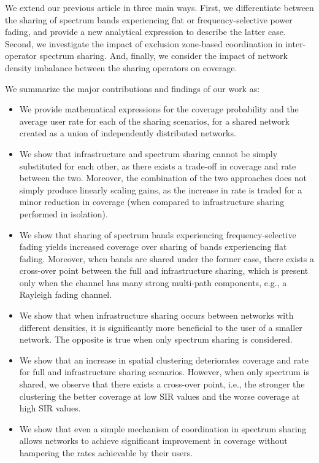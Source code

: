 \documentclass[12pt, journal,doublecolumn, final]{IEEEtran}
\begin{document}
We extend our previous article \cite{KibildaDiFrancescoMalandrinoDaSilva_2015} in three main ways. First, we differentiate between the sharing of spectrum bands experiencing flat or frequency-selective power fading, and provide a new analytical expression to describe the latter case. Second, we investigate the impact of exclusion zone-based coordination in inter-operator spectrum sharing. And, finally, we consider the impact of network density imbalance between the sharing operators on coverage.

We summarize the major contributions and findings of our work as:
\begin{itemize}
\item We provide mathematical expressions for the coverage probability and the average user rate for each of the sharing scenarios, for a shared network created as a union of  independently distributed networks.
\item We show that infrastructure and spectrum sharing cannot be simply substituted for each other, as there exists a trade-off in coverage and rate between the two. Moreover, the combination of the two approaches does not simply produce linearly scaling gains, as the increase in rate is traded for a minor reduction in coverage (when compared to infrastructure sharing performed in isolation).
\item We show that sharing of spectrum bands experiencing frequency-selective fading yields increased coverage over sharing of bands experiencing flat fading. Moreover, when bands are shared under the former case, there exists a cross-over point between the full and infrastructure sharing, which is present only when the channel has many strong multi-path components, e.g., a Rayleigh fading channel.
\item We show that when infrastructure sharing occurs between networks with different densities, it is significantly more beneficial to the user of a smaller network. The opposite is true when only spectrum sharing is considered. 
\item We show that an increase in spatial clustering deteriorates coverage and rate for full and infrastructure sharing scenarios. However, when only spectrum is shared, we observe that there exists a cross-over point, i.e., the stronger the clustering the better coverage at low \ac{SIR} values and the worse coverage at high \ac{SIR} values.
\item We show that even a simple mechanism of coordination in spectrum sharing allows networks to achieve significant improvement in coverage without hampering the rates achievable by their users.
\end{itemize}
\end{document}
